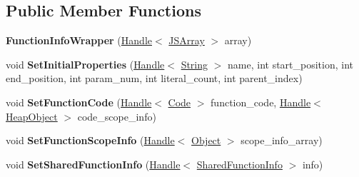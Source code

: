 \subsection*{Public Member Functions}
\begin{DoxyCompactItemize}
\item 
{\bfseries Function\+Info\+Wrapper} (\hyperlink{classv8_1_1internal_1_1_handle}{Handle}$<$ \hyperlink{classv8_1_1internal_1_1_j_s_array}{J\+S\+Array} $>$ array)\hypertarget{classv8_1_1internal_1_1_function_info_wrapper_af1e72c029e4cd74114996cb24a108dc1}{}\label{classv8_1_1internal_1_1_function_info_wrapper_af1e72c029e4cd74114996cb24a108dc1}

\item 
void {\bfseries Set\+Initial\+Properties} (\hyperlink{classv8_1_1internal_1_1_handle}{Handle}$<$ \hyperlink{classv8_1_1internal_1_1_string}{String} $>$ name, int start\+\_\+position, int end\+\_\+position, int param\+\_\+num, int literal\+\_\+count, int parent\+\_\+index)\hypertarget{classv8_1_1internal_1_1_function_info_wrapper_af151474dc98096806be5e2e345146d3c}{}\label{classv8_1_1internal_1_1_function_info_wrapper_af151474dc98096806be5e2e345146d3c}

\item 
void {\bfseries Set\+Function\+Code} (\hyperlink{classv8_1_1internal_1_1_handle}{Handle}$<$ \hyperlink{classv8_1_1internal_1_1_code}{Code} $>$ function\+\_\+code, \hyperlink{classv8_1_1internal_1_1_handle}{Handle}$<$ \hyperlink{classv8_1_1internal_1_1_heap_object}{Heap\+Object} $>$ code\+\_\+scope\+\_\+info)\hypertarget{classv8_1_1internal_1_1_function_info_wrapper_ad29316e6dc3bbb1bc1f1a20f21f62660}{}\label{classv8_1_1internal_1_1_function_info_wrapper_ad29316e6dc3bbb1bc1f1a20f21f62660}

\item 
void {\bfseries Set\+Function\+Scope\+Info} (\hyperlink{classv8_1_1internal_1_1_handle}{Handle}$<$ \hyperlink{classv8_1_1internal_1_1_object}{Object} $>$ scope\+\_\+info\+\_\+array)\hypertarget{classv8_1_1internal_1_1_function_info_wrapper_aadacecb4061d530343a76d8043034605}{}\label{classv8_1_1internal_1_1_function_info_wrapper_aadacecb4061d530343a76d8043034605}

\item 
void {\bfseries Set\+Shared\+Function\+Info} (\hyperlink{classv8_1_1internal_1_1_handle}{Handle}$<$ \hyperlink{classv8_1_1internal_1_1_shared_function_info}{Shared\+Function\+Info} $>$ info)\hypertarget{classv8_1_1internal_1_1_function_info_wrapper_a6fec8707c10f873bb9273f907639254f}{}\label{classv8_1_1internal_1_1_function_info_wrapper_a6fec8707c10f873bb9273f907639254f}


\end{DoxyCompactItemize}
